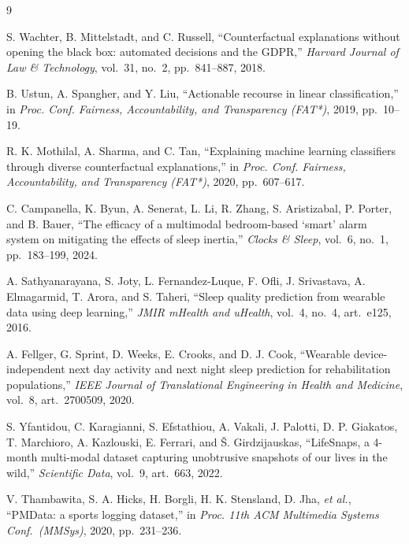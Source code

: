 \documentclass[conference]{IEEEtran}
\begin{document}
\begin{thebibliography}{9}

S. Wachter, B. Mittelstadt, and C. Russell, ``Counterfactual explanations
without opening the black box: automated decisions and the GDPR,''
\emph{Harvard Journal of Law \& Technology}, vol.~31, no.~2, pp.~841--887, 2018.

B. Ustun, A. Spangher, and Y. Liu, ``Actionable recourse in linear
classification,'' in \emph{Proc. Conf. Fairness, Accountability, and
Transparency (FAT*)}, 2019, pp.~10--19.

R. K. Mothilal, A. Sharma, and C. Tan, ``Explaining machine learning classifiers
through diverse counterfactual explanations,'' in \emph{Proc. Conf. Fairness,
Accountability, and Transparency (FAT*)}, 2020, pp.~607--617.

C. Campanella, K. Byun, A. Senerat, L. Li, R. Zhang, S. Aristizabal, P. Porter,
and B. Bauer, ``The efficacy of a multimodal bedroom-based `smart' alarm system
on mitigating the effects of sleep inertia,'' \emph{Clocks \& Sleep}, vol.~6,
no.~1, pp.~183--199, 2024.

A. Sathyanarayana, S. Joty, L. Fernandez-Luque, F. Ofli, J. Srivastava,
A. Elmagarmid, T. Arora, and S. Taheri, ``Sleep quality prediction from wearable
data using deep learning,'' \emph{JMIR mHealth and uHealth}, vol.~4, no.~4,
art.~e125, 2016.

A. Fellger, G. Sprint, D. Weeks, E. Crooks, and D. J. Cook, ``Wearable
device-independent next day activity and next night sleep prediction for
rehabilitation populations,'' \emph{IEEE Journal of Translational Engineering in
Health and Medicine}, vol.~8, art.~2700509, 2020.

S. Yfantidou, C. Karagianni, S. Efstathiou, A. Vakali, J. Palotti, D. P.
Giakatos, T. Marchioro, A. Kazlouski, E. Ferrari, and
\v{S}. Girdzijauskas, ``LifeSnaps, a 4-month multi-modal dataset capturing
unobtrusive snapshots of our lives in the wild,'' \emph{Scientific Data},
vol.~9, art.~663, 2022.

V. Thambawita, S. A. Hicks, H. Borgli, H. K. Stensland, D. Jha, \emph{et al.},
``PMData: a sports logging dataset,'' in \emph{Proc. 11th ACM Multimedia Systems
Conf.\ (MMSys)}, 2020, pp.~231--236.

\end{thebibliography}
\end{document}
